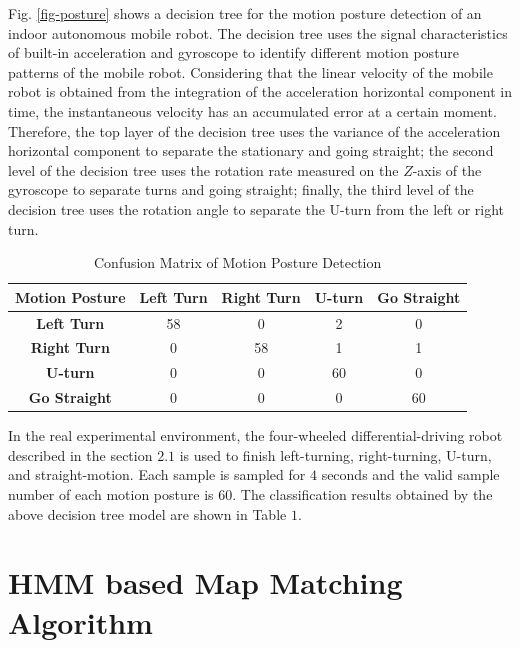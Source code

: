 \documentclass{llncs}
\begin{document}
Fig. \ref{fig-posture} shows a decision tree for the motion posture detection of an indoor autonomous mobile robot. The decision tree uses the signal characteristics of built-in acceleration and gyroscope to identify different motion posture patterns of the mobile robot. Considering that the linear velocity of the mobile robot is obtained from the integration of the acceleration horizontal component in time, the instantaneous velocity has an accumulated error at a certain moment. Therefore, the top layer of the decision tree uses the variance of the acceleration horizontal component to separate the stationary and going straight; the second level of the decision tree uses the rotation rate measured on the $Z$-axis of the gyroscope to separate turns and going straight; finally, the third level of the decision tree uses the rotation angle to separate the U-turn from the left or right turn.

\begin{table}
	\label{table_conf}
	\caption{Confusion Matrix of Motion Posture Detection}
	\begin{center}
		\begin{tabular}{| c || c | c | c | c |}
			\hline
			\bfseries Motion Posture & \bfseries Left Turn & \bfseries Right Turn & \bfseries U-turn & \bfseries Go Straight\\
			\hline\hline
			\bfseries Left Turn & 58 & 0 & 2 & 0 \\
			\hline
			\bfseries Right Turn & 0 & 58 & 1 & 1 \\
			\hline
			\bfseries U-turn & 0 & 0 & 60 & 0 \\
			\hline
			\bfseries Go Straight & 0 & 0 & 0 & 60 \\
			\hline
		\end{tabular}
	\end{center}
\end{table}

In the real experimental environment, the four-wheeled differential-driving robot described in the section $2.1$ is used to finish left-turning, right-turning, U-turn, and straight-motion. Each sample is sampled for $4$ seconds and the valid sample number of each motion posture is $60$. The classification results obtained by the above decision tree model are shown in Table $1$.

\section{HMM based Map Matching Algorithm}
\end{document}
